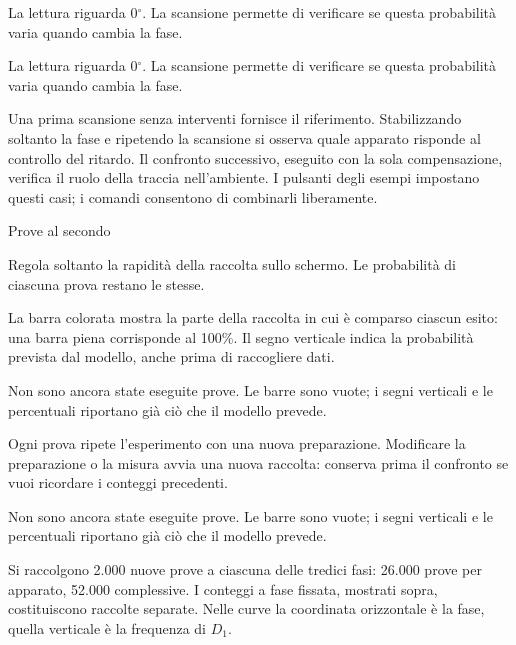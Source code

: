 La lettura riguarda \(0{}^{\circ} \). La scansione permette di verificare se questa probabilità varia quando cambia la fase.\par

La lettura riguarda \(0{}^{\circ} \). La scansione permette di verificare se questa probabilità varia quando cambia la fase.\par

Una prima scansione senza interventi fornisce il riferimento. Stabilizzando soltanto la fase e ripetendo la scansione si osserva quale apparato risponde al controllo del ritardo. Il confronto successivo, eseguito con la sola compensazione, verifica il ruolo della traccia nell'ambiente. I pulsanti degli esempi impostano questi casi; i comandi consentono di combinarli liberamente.\par

Prove al secondo\par

Regola soltanto la rapidità della raccolta sullo schermo. Le probabilità di ciascuna prova restano le stesse.\par

La barra colorata mostra la parte della raccolta in cui è comparso ciascun esito: una barra piena corrisponde al 100\%. Il segno verticale indica la probabilità prevista dal modello, anche prima di raccogliere dati.\par

Non sono ancora state eseguite prove. Le barre sono vuote; i segni verticali e le percentuali riportano già ciò che il modello prevede.\par

Ogni prova ripete l'esperimento con una nuova preparazione. Modificare la preparazione o la misura avvia una nuova raccolta: conserva prima il confronto se vuoi ricordare i conteggi precedenti.\par

Non sono ancora state eseguite prove. Le barre sono vuote; i segni verticali e le percentuali riportano già ciò che il modello prevede.\par

Si raccolgono 2.000 nuove prove a ciascuna delle tredici fasi: 26.000 prove per apparato, 52.000 complessive. I conteggi a fase fissata, mostrati sopra, costituiscono raccolte separate. Nelle curve la coordinata orizzontale è la fase, quella verticale è la frequenza di \(D_{1}\).\par

